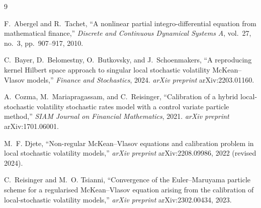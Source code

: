 \documentclass[11pt,a4paper]{article}
\theoremstyle{plain}
\theoremstyle{definition}
\theoremstyle{definition}
\begin{document}
\begin{thebibliography}{9}

 F.~Abergel and R.~Tachet, ``A nonlinear partial integro-differential equation from mathematical finance,'' \textit{Discrete and Continuous Dynamical Systems A}, vol.~27, no.~3, pp.~907--917, 2010.

 C.~Bayer, D.~Belomestny, O.~Butkovsky, and J.~Schoenmakers, ``A reproducing kernel Hilbert space approach to singular local stochastic volatility McKean--Vlasov models,'' \textit{Finance and Stochastics}, 2024. \textit{arXiv preprint} arXiv:2203.01160.

 A.~Cozma, M.~Mariapragassam, and C.~Reisinger, ``Calibration of a hybrid local-stochastic volatility stochastic rates model with a control variate particle method,'' \textit{SIAM Journal on Financial Mathematics}, 2021. \textit{arXiv preprint} arXiv:1701.06001.

 M.~F. Djete, ``Non-regular McKean--Vlasov equations and calibration problem in local stochastic volatility models,'' \textit{arXiv preprint} arXiv:2208.09986, 2022 (revised 2024).

 C.~Reisinger and M.~O. Tsianni, ``Convergence of the Euler--Maruyama particle scheme for a regularised McKean--Vlasov equation arising from the calibration of local-stochastic volatility models,'' \textit{arXiv preprint} arXiv:2302.00434, 2023.

\end{thebibliography}
\end{document}
